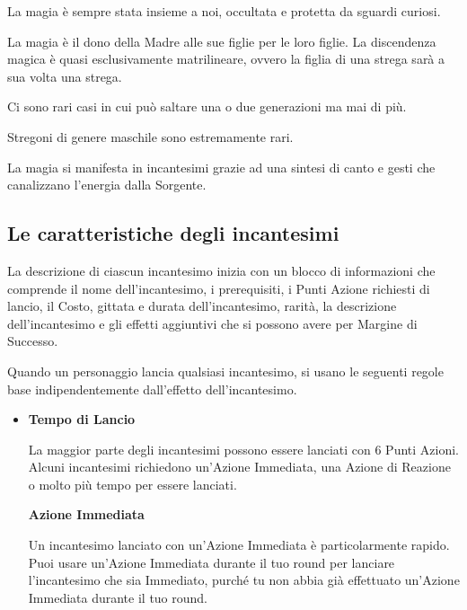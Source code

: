 \documentclass[12pt,a4paper,twoside,openany]{book}
\begin{document}
\begin{multicols}{2}
	
La magia è sempre stata insieme a noi, occultata e protetta da sguardi curiosi.

La magia è il dono della Madre alle sue figlie per le loro figlie.
La discendenza magica è quasi esclusivamente matrilineare, ovvero la figlia di una strega sarà a sua volta una strega.

Ci sono rari casi in cui può saltare una o due generazioni ma mai di più.

Stregoni di genere maschile sono estremamente rari.

La magia si manifesta in incantesimi grazie ad una sintesi di canto e gesti che canalizzano l'energia dalla Sorgente.

\subsection{Le caratteristiche degli incantesimi}\label{caratteristicheincantesimi}

La descrizione di ciascun incantesimo inizia con un blocco di informazioni che comprende il nome dell'incantesimo, i prerequisiti, i Punti Azione richiesti di lancio, il Costo, gittata e durata dell'incantesimo, rarità, la descrizione dell'incantesimo e gli effetti aggiuntivi che si possono avere per Margine di Successo.

Quando un personaggio lancia qualsiasi incantesimo, si usano le seguenti regole base indipendentemente dall'effetto dell'incantesimo.

\begin{itemize}
	
\item \textbf{Tempo di Lancio}\label{magietempodilancio}

La maggior parte degli incantesimi possono essere lanciati con 6 Punti Azioni. Alcuni incantesimi richiedono un'Azione Immediata, una Azione di Reazione o molto più tempo per essere lanciati.

\subitem \textbf{Azione Immediata}

Un incantesimo lanciato con un'Azione Immediata è particolarmente rapido. Puoi usare un'Azione Immediata durante il tuo round per lanciare l'incantesimo che sia Immediato, purché tu non abbia già effettuato un'Azione Immediata durante il tuo round.


\end{itemize}
\end{multicols}
\end{document}
